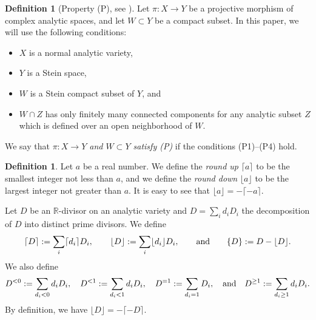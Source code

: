 \documentclass[12pt]{amsart}
\theoremstyle{definition}
\newtheorem{defn}[thm]{Definition}
\begin{document}
\begin{defn}[Property (P), see {\cite{fujino-analytic-bchm}}]\label{defn--property(P)}
Let $\pi \colon X \to Y$ be a projective morphism of complex analytic spaces, and let $W \subset Y$ be a compact subset. 
In this paper, we will use the following conditions:
\begin{itemize}
\item[(P1)]
$X$ is a normal analytic variety,
\item[(P2)]
$Y$ is a Stein space,
\item[(P3)]
$W$ is a Stein compact subset of $Y$, and
\item[(P4)]
$W \cap Z$ has only finitely many connected components for any analytic subset $Z$
which is defined over an open neighborhood of $W$. 
\end{itemize}
We say that {\em $\pi \colon X \to Y$ and $W \subset Y$ satisfy (P)} if the conditions (P1)--(P4) hold. 
\end{defn}


\begin{defn}
Let $a$ be a real number. 
We define the {\em round up} $\lceil a \rceil$ to be the smallest integer not less than $a$, and we define the {\em round down} $\lfloor a \rfloor$ to be the largest integer not greater than $a$. 
It is easy to see that $\lfloor a \rfloor=- \lceil -a \rceil$. 

Let $D$ be an $\mathbb{R}$-divisor on an analytic variety and $D=\sum_{i}d_{i}D_{i}$ the decomposition of $D$ into distinct prime divisors. 
We define
\begin{equation*}
\begin{split}
\lceil D\rceil:=\sum_{i}\lceil d_{i} \rceil D_{i}, \qquad \lfloor D \rfloor:= \sum_{i}\lfloor d_{i} \rfloor D_{i}, \qquad {\rm and} \qquad \{D\}:=D-\lfloor D \rfloor.
\end{split}
\end{equation*}
We also define
\begin{equation*}
D^{<0} :=\sum_{d_{i}<0}d_{i}D_{i}, \quad 
D^{<1} :=\sum_{d_{i}<1}d_{i}D_{i}, \quad 
D^{= 1}:=\sum_{d_{i}= 1} D_{i}, \quad 
{\rm and} \quad 
D^{\geq 1}:=\sum_{d_{i}\geq 1}d_{i} D_{i}. 
\end{equation*}
By definition, we have $\lfloor D \rfloor = -\lceil -D \rceil$. 
\end{defn}
\end{document}
